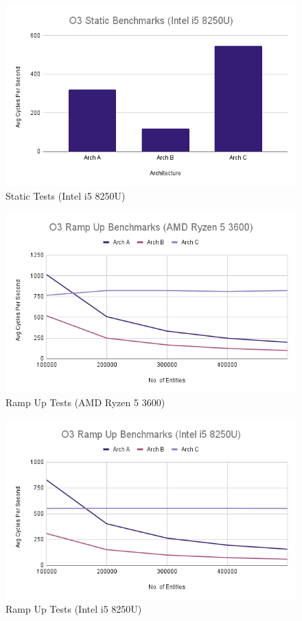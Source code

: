 \documentclass{article}
\begin{document}
\begin{figure}[!h]
\centering
\includegraphics[scale=0.5]{O3 Static Benchmarks (Intel i5 8250U).png}
\caption{Static Tests (Intel i5 8250U)}
\label{laptop_static_tests}
\end{figure}

\begin{figure}[!h]
\centering
\includegraphics[scale=0.5]{O3 Ramp Up Benchmarks (AMD Ryzen 5 3600).png}
\caption{Ramp Up Tests (AMD Ryzen 5 3600)}
\label{pc_ramp_up_tests}
\end{figure}

\begin{figure}[!h]
\centering
\includegraphics[scale=0.5]{O3 Ramp Up Benchmarks (Intel i5 8250U).png}
\caption{Ramp Up Tests (Intel i5 8250U)}
\label{laptop_ramp_up_tests}
\end{figure}
\end{document}
